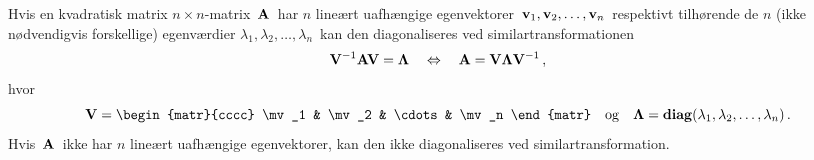 \begin{theorem} \label{saet.diag}
Hvis en kvadratisk matrix $n\times n$-matrix $\,\mathbf{A}\,$ har $ n $ lineært uafhængige egenvektorer $\, \mathbf{v}_1, \mathbf{v}_2, \ldots, \mathbf{v}_n \,$ respektivt tilhørende de $n$ (ikke nødvendigvis forskellige) egenværdier $\lambda_1, \lambda_2, \ldots, \lambda_n\,$ kan den diagonaliseres ved similartransformationen 
\begin{equation}
\mathbf{V}^{-1} \mathbf{A} \mathbf{V} = \bm{\Lambda} \quad \Leftrightarrow \quad \mathbf{A} = \mathbf{V} \bm{\Lambda} \mathbf{V}^{-1} \, ,
\end{equation}
hvor
\begin{equation}
\mV = \begin{matr}{cccc} \mv_1 & \mv_2 & \cdots & \mv_n \end{matr} \quad \mathrm{og} \quad \mL = \diag(\lambda_1, \lambda_2, \ldots, \lambda_n) \, .
\end{equation}
Hvis $\,\mathbf{A}\,$ ikke har $ n $ lineært uafhængige egenvektorer, kan den ikke diagonaliseres ved similartransformation.
\end{theorem}

